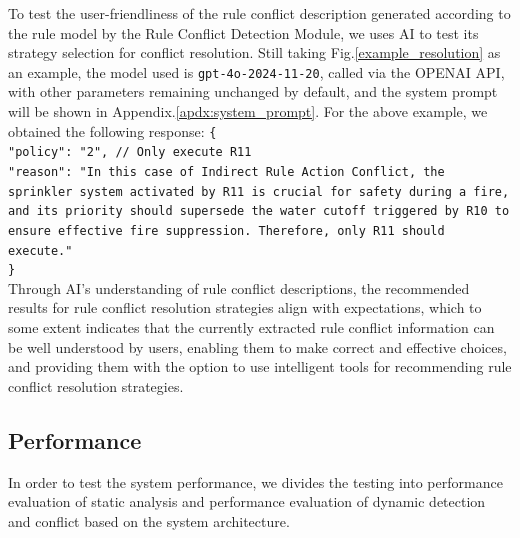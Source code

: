 To test the user-friendliness of the rule conflict description generated according to the rule model by the Rule Conflict Detection Module, we uses AI to test its strategy selection for conflict resolution. Still taking Fig.\ref{example_resolution} as an example, the model used is \texttt{gpt-4o-2024-11-20}, called via the OPENAI API, with other parameters remaining unchanged by default, and the system prompt will be shown in Appendix.\ref{apdx:system_prompt}. For the above example, we obtained the following response: 
\texttt{\{\\
	"policy": "2", // Only execute R11 \\
	"reason": "In this case of Indirect Rule Action Conflict, the sprinkler system activated by R11 is crucial for safety during a fire, and its priority should supersede the water cutoff triggered by R10 to ensure effective fire suppression. Therefore, only R11 should execute."\\
	\}}\\

Through AI's understanding of rule conflict descriptions, the recommended results for rule conflict resolution strategies align with expectations, which to some extent indicates that the currently extracted rule conflict information can be well understood by users, enabling them to make correct and effective choices, and providing them with the option to use intelligent tools for recommending rule conflict resolution strategies.

\subsection{Performance} 
In order to test the system performance, we divides the testing into performance evaluation of static analysis and performance evaluation of dynamic detection and conflict based on the system architecture.

